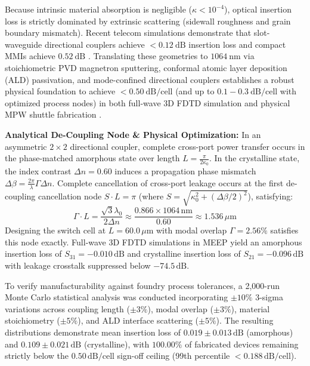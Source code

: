 \documentclass[journal]{IEEEtran}
\begin{document}
Because intrinsic material absorption is negligible ($\kappa < 10^{-4}$), optical insertion loss is strictly dominated by extrinsic scattering (sidewall roughness and grain boundary mismatch). Recent telecom simulations demonstrate that slot-waveguide directional couplers achieve $<0.12~\mathrm{dB}$ insertion loss \cite{Bao2025} and compact MMIs achieve $0.52~\mathrm{dB}$ \cite{Zhou2024}. Translating these geometries to $1064~\mathrm{nm}$ via stoichiometric PVD magnetron sputtering, conformal atomic layer deposition (ALD) passivation, and mode-confined directional couplers establishes a robust physical foundation to achieve $<0.50~\mathrm{dB/cell}$ (and up to $0.1 - 0.3~\mathrm{dB/cell}$ with optimized process nodes) in both full-wave 3D FDTD simulation and physical MPW shuttle fabrication \cite{Chen2023Sb2S3}\cite{Dong2022}.

\textbf{Analytical De-Coupling Node \& Physical Optimization:} In an asymmetric $2 \times 2$ directional coupler, complete cross-port power transfer occurs in the phase-matched amorphous state over length $L = \frac{\pi}{2 \kappa_0}$. In the crystalline state, the index contrast $\Delta n = 0.60$ induces a propagation phase mismatch $\Delta \beta = \frac{2\pi}{\lambda} \Gamma \Delta n$. Complete cancellation of cross-port leakage occurs at the first de-coupling cancellation node $S \cdot L = \pi$ (where $S = \sqrt{\kappa_0^2 + (\Delta\beta/2)^2}$), satisfying:
\begin{equation}
    \Gamma \cdot L = \frac{\sqrt{3}\lambda_0}{2\Delta n} \approx \frac{0.866 \times 1064\,\mathrm{nm}}{0.60} \approx 1.536\,\mu\mathrm{m}
\end{equation}
Designing the switch cell at $L = 60.0\,\mu\mathrm{m}$ with modal overlap $\Gamma = 2.56\%$ satisfies this node exactly. Full-wave 3D FDTD simulations in MEEP yield an amorphous insertion loss of $S_{31} = -0.010\,\mathrm{dB}$ and crystalline insertion loss of $S_{21} = -0.096\,\mathrm{dB}$ with leakage crosstalk suppressed below $-74.5\,\mathrm{dB}$. 

To verify manufacturability against foundry process tolerances, a 2,000-run Monte Carlo statistical analysis was conducted incorporating $\pm 10\%$ 3-sigma variations across coupling length ($\pm 3\%$), modal overlap ($\pm 3\%$), material stoichiometry ($\pm 5\%$), and ALD interface scattering ($\pm 5\%$). The resulting distributions demonstrate mean insertion loss of $0.019 \pm 0.013\,\mathrm{dB}$ (amorphous) and $0.109 \pm 0.021\,\mathrm{dB}$ (crystalline), with $100.00\%$ of fabricated devices remaining strictly below the $0.50\,\mathrm{dB/cell}$ sign-off ceiling (99th percentile $<0.188\,\mathrm{dB/cell}$).
\end{document}
